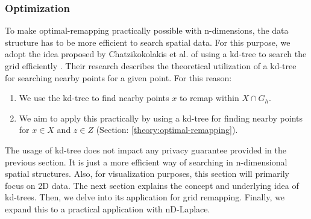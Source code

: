{\subsubsection{Optimization}
To make optimal-remapping practically possible with n-dimensions, the data structure has to be more efficient to search spatial data. For this purpose, we adopt the idea proposed by Chatzikokolakis et al. of using a kd-tree to search the grid efficiently \citep{chatzikokolakis_efficient_2017}.
Their research describes the theoretical utilization of a kd-tree for searching nearby points for a given point.
For this reason:
\begin{enumerate}
    \item     We use the kd-tree to find nearby points $x$ to remap within $X \cap G_h$.
    \item We aim to apply this practically by using a kd-tree for finding nearby points for $x \in X$ and $z \in Z$ (Section: \ref{theory:optimal-remapping}). 
\end{enumerate}
The usage of kd-tree does not impact any privacy guarantee provided in the previous section. It is just a more efficient way of searching in n-dimensional spatial structures. Also, for visualization purposes, this section will primarily focus on 2D data. \newline
The next section explains the concept and underlying idea of kd-trees.
Then, we delve into its application for grid remapping.
Finally, we expand this to a practical application with nD-Laplace.

}
